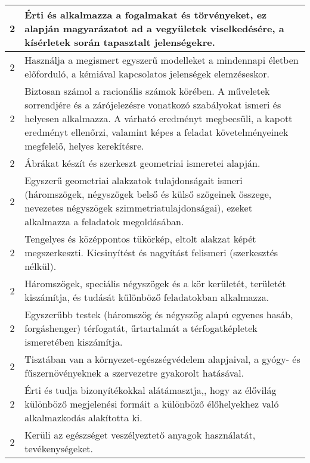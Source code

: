 \begin{longtable}{c | p{12cm} }
                                          2 &  Érti és alkalmazza a fogalmakat és törvényeket, ez alapján magyarázatot ad a vegyületek viselkedésére, a kísérletek során tapasztalt jelenségekre. \\ \hline
                                          2 &  Használja a megismert egyszerű modelleket a mindennapi életben előforduló, a kémiával kapcsolatos jelenségek elemzéseskor. \\ \hline
                                          2 &  Biztosan számol a racionális számok körében. A műveletek sorrendjére és a zárójelezésre vonatkozó szabályokat ismeri és helyesen alkalmazza. A várható eredményt megbecsüli, a kapott  eredményt ellenőrzi, valamint képes a feladat követelményeinek megfelelő, helyes kerekítésre. \\ \hline
                                          2 &  Ábrákat készít és szerkeszt geometriai ismeretei alapján. \\ \hline
                                          2 &  Egyszerű geometriai alakzatok tulajdonságait ismeri (háromszögek, négyszögek belső és külső szögeinek összege, nevezetes négyszögek szimmetriatulajdonságai), ezeket alkalmazza a feladatok megoldásában. \\ \hline
                                          2 &  Tengelyes és középpontos tükörkép, eltolt alakzat képét megszerkeszti. Kicsinyítést és nagyítást felismeri (szerkesztés nélkül). \\ \hline
                                          2 &  Háromszögek, speciális négyszögek és a kör kerületét, területét kiszámítja, és tudását különböző feladatokban alkalmazza. \\ \hline
                                          2 &  Egyszerűbb testek (háromszög és négyszög alapú egyenes hasáb, forgáshenger) térfogatát, űrtartalmát a térfogatképletek ismeretében kiszámítja. \\ \hline
                                          2 &  Tisztában van a környezet-egészségvédelem alapjaival, a gyógy- és fűszernövényeknek a szervezetre gyakorolt hatásával. \\ \hline
                                          2 &  Érti és tudja bizonyítékokkal alátámasztja,, hogy az élővilág különböző megjelenési formáit a különböző élőhelyekhez való alkalmazkodás alakította ki. \\ \hline
                                          2 &  Kerüli az egészséget veszélyeztető anyagok használatát, tevékenységeket. \\ \hline
                                      

\end{longtable}
